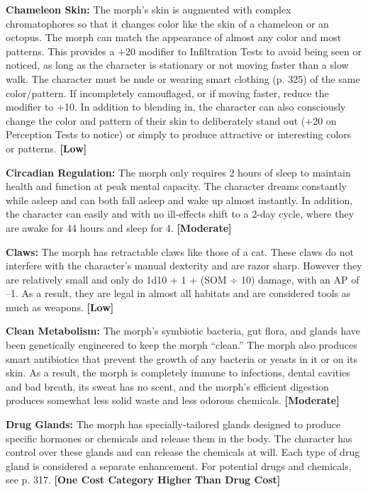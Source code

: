 \textbf{Chameleon Skin: }The morph's skin is augmented 
with complex chromatophores so that it changes color 
like the skin of a chameleon or an octopus. The morph 
can match the appearance of almost any color and 
most patterns. This provides a +20 modifier to Infiltration
Tests to avoid being seen or noticed, as long as
the character is stationary or not moving faster than 
a slow walk. The character must be nude or wearing 
smart clothing (p. 325) of the same color/pattern. If 
incompletely camouflaged, or if moving faster, reduce 
the modifier to +10. In addition to blending in, the 
character can also consciously change the color and 
pattern of their skin to deliberately stand out (+20 on 
Perception Tests to notice) or simply to produce attractive
or interesting colors or patterns. \textbf{[Low]}

\textbf{Circadian Regulation:} The morph only requires 
2 hours of sleep to maintain health and function at 
peak mental capacity. The character dreams constantly 
while asleep and can both fall asleep and wake up 
almost instantly. In addition, the character can easily 
and with no ill-effects shift to a 2-day cycle, where they 
are awake for 44 hours and sleep for 4. \textbf{[Moderate]}

\textbf{Claws: }The morph has retractable claws like those 
of a cat. These claws do not interfere with the character's
manual dexterity and are razor sharp. However
they are relatively small and only do 1d10 + 1
+ (SOM ÷ 10) damage, with an AP of –1. As a result, 
they are legal in almost all habitats and are considered 
tools as much as weapons. \textbf{[Low]}

\textbf{Clean Metabolism: }The morph's symbiotic bacteria, 
gut flora, and glands have been genetically engineered 
to keep the morph ``clean.'' The morph also produces 
smart antibiotics that prevent the growth of any 
bacteria or yeasts in it or on its skin. As a result, the 
morph is completely immune to infections, dental cavities
and bad breath, its sweat has no scent, and the
morph's efficient digestion produces somewhat less 
solid waste and less odorous chemicals. \textbf{[Moderate]}

\textbf{Drug Glands: }The morph has specially-tailored 
glands designed to produce specific hormones or 
chemicals and release them in the body. The character
has control over these glands and can release the
chemicals at will. Each type of drug gland is considered
a separate enhancement. For potential drugs and
chemicals, see p. 317. \textbf{[One Cost Category Higher }
\textbf{Than Drug Cost]}

